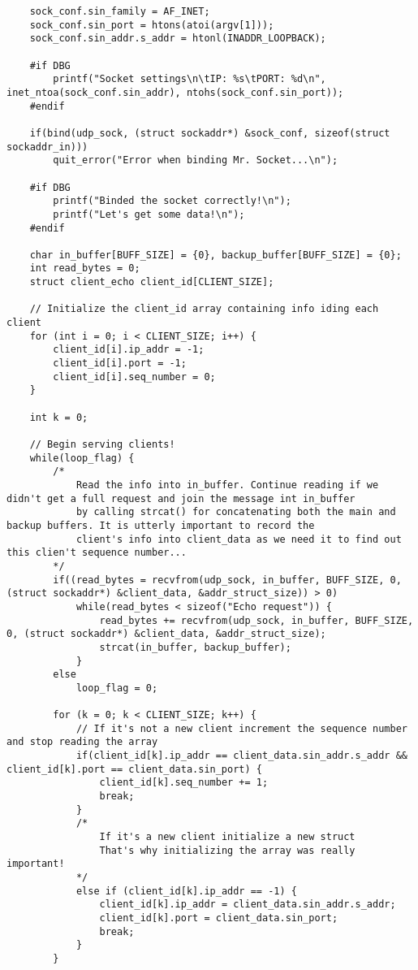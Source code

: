 \documentclass[landscape]{article}
\begin{document}
\begin{verbatim}
    sock_conf.sin_family = AF_INET;
    sock_conf.sin_port = htons(atoi(argv[1]));
    sock_conf.sin_addr.s_addr = htonl(INADDR_LOOPBACK);

    #if DBG
        printf("Socket settings\n\tIP: %s\tPORT: %d\n", inet_ntoa(sock_conf.sin_addr), ntohs(sock_conf.sin_port));
    #endif

    if(bind(udp_sock, (struct sockaddr*) &sock_conf, sizeof(struct sockaddr_in)))
        quit_error("Error when binding Mr. Socket...\n");

    #if DBG
        printf("Binded the socket correctly!\n");
        printf("Let's get some data!\n");
    #endif

    char in_buffer[BUFF_SIZE] = {0}, backup_buffer[BUFF_SIZE] = {0};
    int read_bytes = 0;
    struct client_echo client_id[CLIENT_SIZE];

    // Initialize the client_id array containing info iding each client
    for (int i = 0; i < CLIENT_SIZE; i++) {
        client_id[i].ip_addr = -1;
        client_id[i].port = -1;
        client_id[i].seq_number = 0;
    }

    int k = 0;

    // Begin serving clients!
    while(loop_flag) {
        /*
            Read the info into in_buffer. Continue reading if we didn't get a full request and join the message int in_buffer
            by calling strcat() for concatenating both the main and backup buffers. It is utterly important to record the
            client's info into client_data as we need it to find out this clien't sequence number...
        */
        if((read_bytes = recvfrom(udp_sock, in_buffer, BUFF_SIZE, 0, (struct sockaddr*) &client_data, &addr_struct_size)) > 0)
            while(read_bytes < sizeof("Echo request")) {
                read_bytes += recvfrom(udp_sock, in_buffer, BUFF_SIZE, 0, (struct sockaddr*) &client_data, &addr_struct_size);
                strcat(in_buffer, backup_buffer);
            }
        else
            loop_flag = 0;

        for (k = 0; k < CLIENT_SIZE; k++) {
            // If it's not a new client increment the sequence number and stop reading the array
            if(client_id[k].ip_addr == client_data.sin_addr.s_addr && client_id[k].port == client_data.sin_port) {
                client_id[k].seq_number += 1;
                break;
            }
            /*
                If it's a new client initialize a new struct
                That's why initializing the array was really important!
            */
            else if (client_id[k].ip_addr == -1) {
                client_id[k].ip_addr = client_data.sin_addr.s_addr;
                client_id[k].port = client_data.sin_port;
                break;
            }
        }


\end{verbatim}
\end{document}
